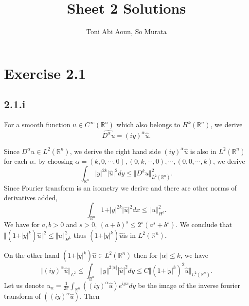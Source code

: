 \documentclass{article}
\title{Sheet 2 Solutions}
\author{Toni Abi Aoun, So Murata}
\date{}
\begin{document}
\maketitle

\section*{Exercise 2.1}

\subsection*{2.1.i}

For a smooth function $u\in C^\infty(\mathbb{R}^n)$ which also belongs to $H^k(\mathbb{R}^n)$, we derive
\begin{equation*}
\widehat{D^\alpha u} = (iy)^\alpha \hat{u}.
\end{equation*}

Since $D^\alpha u\in L^2(\mathbb{R}^n)$, we derive the right hand side $(iy)^\alpha \hat{u}$ is also in $L^2(\mathbb{R}^n)$ for each $\alpha$. by choosing $\alpha = (k,0,\cdots,0),(0,k,\cdots,0),\cdots,(0,0,\cdots,k)$, we derive
\begin{equation*}
\int_{\mathbb{R}^n}\vert y\vert^{2k}\vert\hat{u}\vert^2 dy \leq \Vert D^k u\Vert^2_{L^2(\mathbb{R}^n)}.
\end{equation*}
Since Fourier transform is an isometry we derive and there are other norms of derivatives added,
\begin{equation*}
\int_{\mathbb{R}^n}1+\vert y\vert^{2k}\vert\hat{u}\vert^2dx\leq \Vert u\Vert^2_{H^k}.
\end{equation*}
We have for $a,b>0$ and $s>0$, $(a+b)^s\leq 2^s(a^s+b^s)$.
We conclude that $\Vert (1+\vert y\vert^{k})\hat{u}\Vert^2\leq\Vert u\Vert^2_{H^k}$ thus $ (1+\vert y\vert^{k})\hat{u}$is in $L^2(\mathbb{R}^n)$. \\
\par On the other hand $(1+\vert y\vert^{k})\hat{u}\in L^2(\mathbb{R}^n)$ then for $|\alpha|\leq k$, we have 
\begin{equation}
\label{L2_derivative}
\Vert (iy)^\alpha\hat{u}\Vert_{L^2} \leq \int_{\mathbb{R}^n}\Vert y\Vert^{2|\alpha|}|\hat{u}|^2 dy\leq C\Vert(1+\vert y\vert^{k})^2\hat{u}\Vert_{L^2(\mathbb{R}^n)}.
\end{equation}
Let us denote $u_\alpha = {\frac 1 {2\pi}}\int_{\mathbb{R}^n}((iy)^\alpha\hat{u})e^{iyx}dy$ be the image of the inverse fourier transform of $((iy)^\alpha\hat{u})$. Then
\end{document}
